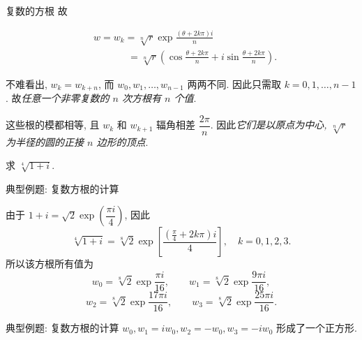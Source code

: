 \begin{frame}{复数的方根}
\onslide<+->
故
\begin{alertblock*}{}
\begin{align*}
	&w=w_k=\sqrt[n]r\exp\frac{(\theta+2k\pi)i}n\\
	&\hspace{42pt}=\sqrt[n]r\left(\cos\frac{\theta+2k\pi}n+i\sin\frac{\theta+2k\pi}n\right).
\end{align*}
\end{alertblock*}
\onslide<+->
不难看出, $w_k=w_{k+n}$, 而 $w_0,w_1,\dots,w_{n-1}$ 两两不同.
\onslide<+->
因此只需取 \alert{$k=0,1,\dots,n-1$}.
\onslide<+->
故\emph{任意一个非零复数的 $n$ 次方根有 $n$ 个值}.

\onslide<+->
这些根的模都相等, 且 $w_k$ 和 $w_{k+1}$ 辐角相差 $\dfrac{2\pi}n$.
\onslide<+->
因此\emph{它们是以原点为中心, $\sqrt[n]r$ 为半径的圆的正接 $n$ 边形的顶点}.

\onslide<+->
\begin{example}
求 $\sqrt[4]{1+i}$.
\end{example}
\end{frame}


\begin{frame}{典型例题: 复数方根的计算}
\begin{solution}
由于 $1+i=\sqrt2\exp\left(\dfrac{\pi i}4\right)$,
\onslide<+->
因此
\[\sqrt[4]{1+i}=\sqrt[8]2\exp\left[\frac{(\frac\pi4+2k\pi)i}4\right],\quad k=0,1,2,3.\]
\onslide<+->
所以该方根所有值为
\[w_0=\sqrt[8]2\exp\frac{\pi i}{16},\qquad
w_1=\sqrt[8]2\exp\frac{9\pi i}{16},\]
\[w_2=\sqrt[8]2\exp\frac{17\pi i}{16},\qquad
w_3=\sqrt[8]2\exp\frac{25\pi i}{16}.\]
\end{solution}
\end{frame}


\begin{frame}{典型例题: 复数方根的计算}
\onslide<+->
$w_0,w_1=iw_0,w_2=-w_0,w_3=-iw_0$ 形成了一个正方形.
\onslide<+->
\begin{center}
\end{center}
\end{frame}


